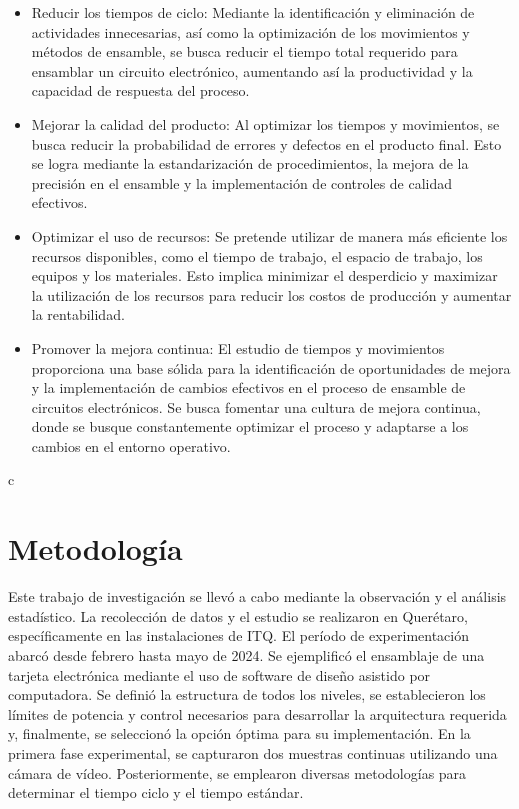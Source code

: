     \begin{itemize}
            \item Reducir los tiempos de ciclo: Mediante la identificación y eliminación de actividades innecesarias, así como la optimización de los movimientos y métodos de ensamble, se busca reducir el tiempo total requerido para ensamblar un circuito electrónico, aumentando así la productividad y la capacidad de respuesta del proceso.
            \item Mejorar la calidad del producto: Al optimizar los tiempos y movimientos, se busca reducir la probabilidad de errores y defectos en el producto final. Esto se logra mediante la estandarización de procedimientos, la mejora de la precisión en el ensamble y la implementación de controles de calidad efectivos.
            \item Optimizar el uso de recursos: Se pretende utilizar de manera más eficiente los recursos disponibles, como el tiempo de trabajo, el espacio de trabajo, los equipos y los materiales. Esto implica minimizar el desperdicio y maximizar la utilización de los recursos para reducir los costos de producción y aumentar la rentabilidad.
            \item Promover la mejora continua: El estudio de tiempos y movimientos proporciona una base sólida para la identificación de oportunidades de mejora y la implementación de cambios efectivos en el proceso de ensamble de circuitos electrónicos. Se busca fomentar una cultura de mejora continua, donde se busque constantemente optimizar el proceso y adaptarse a los cambios en el entorno operativo. 
    
        \end{itemize}
    c\section{Metodología}
    
    Este trabajo de investigación se llevó a cabo mediante la observación y el análisis estadístico. La recolección de datos y el estudio se realizaron en Querétaro, específicamente en las instalaciones de ITQ. El período de experimentación abarcó desde febrero hasta mayo de 2024.
    Se ejemplificó el ensamblaje de una tarjeta electrónica mediante el uso de software de diseño asistido por computadora. Se definió la estructura de todos los niveles, se establecieron los límites de potencia y control necesarios para desarrollar la arquitectura requerida y, finalmente, se seleccionó la opción óptima para su implementación.
    En la primera fase experimental, se capturaron dos muestras continuas utilizando una cámara de vídeo. Posteriormente, se emplearon diversas metodologías para determinar el tiempo ciclo y el tiempo estándar.
